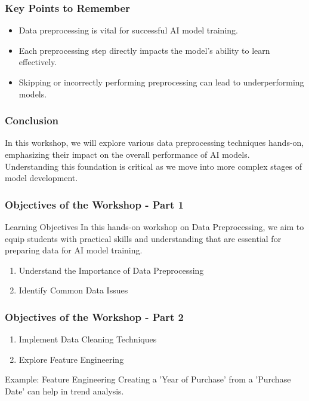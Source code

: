 \documentclass{beamer}
\begin{document}
\begin{frame}[fragile]
    \frametitle{Key Points to Remember}
    \begin{itemize}
        \item Data preprocessing is vital for successful AI model training.
        \item Each preprocessing step directly impacts the model’s ability to learn effectively.
        \item Skipping or incorrectly performing preprocessing can lead to underperforming models.
    \end{itemize}
\end{frame}

\begin{frame}[fragile]
    \frametitle{Conclusion}
    In this workshop, we will explore various data preprocessing techniques hands-on, emphasizing their impact on the overall performance of AI models. Understanding this foundation is critical as we move into more complex stages of model development.
\end{frame}

\begin{frame}[fragile]
    \frametitle{Objectives of the Workshop - Part 1}
    \begin{block}{Learning Objectives}
        In this hands-on workshop on Data Preprocessing, we aim to equip students with practical skills and understanding that are essential for preparing data for AI model training. 
    \end{block}
    \begin{enumerate}
        \item Understand the Importance of Data Preprocessing
        \item Identify Common Data Issues
    \end{enumerate}
\end{frame}

\begin{frame}[fragile]
    \frametitle{Objectives of the Workshop - Part 2}
    \begin{enumerate}[resume]
        \item Implement Data Cleaning Techniques
        \item Explore Feature Engineering
    \end{enumerate}
    \begin{block}{Example: Feature Engineering}
        Creating a 'Year of Purchase' from a 'Purchase Date' can help in trend analysis.
    \end{block}
\end{frame}
\end{document}
